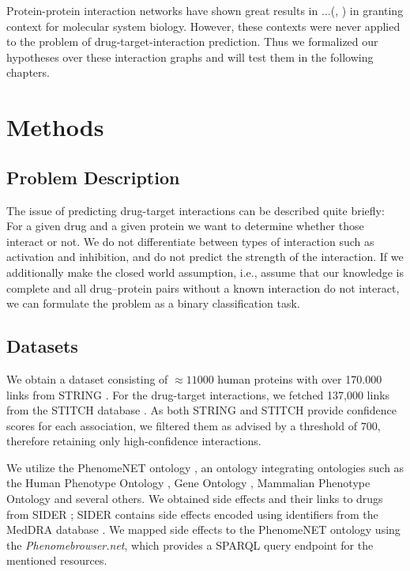 \documentclass{bioinfo}
\renewcommand{\cite}{\citep}
\begin{document}
Protein-protein interaction networks have shown great results in
$\dots$(\cite{Vazquez2003}, \cite{Ackerman2019}) in granting context
for molecular system biology. However, these contexts were never
applied to the problem of drug-target-interaction prediction. Thus we
formalized our hypotheses over these interaction graphs and will test
them in the following chapters.

\enlargethispage{12pt}

\section{Methods}
\subsection{Problem Description}
The issue of predicting drug-target interactions can be described
quite briefly: For a given drug and a given protein we want to
determine whether those interact or not.  We do not differentiate
between types of interaction such as activation and inhibition, and do
not predict the strength of the interaction.  If we additionally make
the closed world assumption, i.e., assume that our knowledge is
complete and all drug--protein pairs without a known interaction do
not interact, we can formulate the problem as a binary classification
task.


\subsection{Datasets}
We obtain a dataset consisting of $\approx 11000$
human proteins with over 170.000 links from STRING
\citep{STRINGv10}. For the drug-target interactions, we
fetched 137,000 links from the STITCH database
\citep{STITCHv5}. As both STRING and STITCH provide confidence scores
for each association, we filtered them as advised by a threshold of
$700$, therefore retaining only high-confidence interactions.

We utilize the PhenomeNET ontology \citep{PhenomeNET2011}, an ontology
integrating ontologies such as the Human Phenotype Ontology
\citep{HPO2018}, Gene Ontology \cite{GOoriginal2000, GOrecent2020},
Mammalian Phenotype Ontology \citep{MP2009} and several others.
We obtained side effects and their links to drugs from SIDER
\citep{SIDER}; SIDER contains side effects encoded using identifiers
from the MedDRA database \citep{MedDRA}. We mapped side effects to the
PhenomeNET ontology using the \textit{Phenomebrowser.net}, which
provides a SPARQL query endpoint for the mentioned resources.
\end{document}
